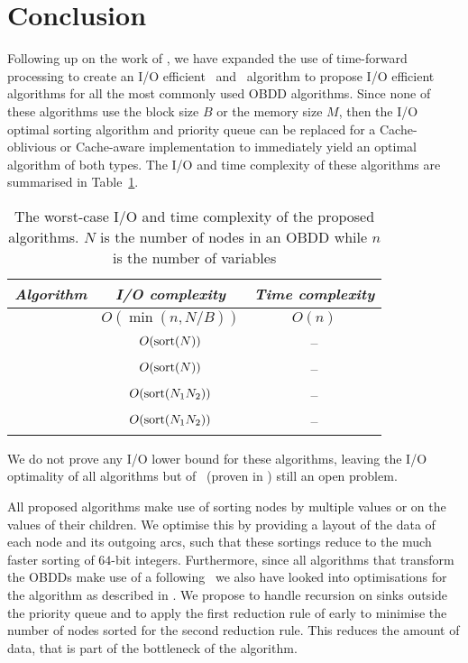 \section{Conclusion} \label{sec:conclusion}
Following up on the work of \cite{Arge96}, we have expanded the use of
time-forward processing to create an I/O efficient \Reduce\ and \Apply\
algorithm to propose I/O efficient algorithms for all the most commonly used
OBDD algorithms. Since none of these algorithms use the block size $B$ or the
memory size $M$, then the I/O optimal sorting algorithm and priority queue can
be replaced for a Cache-oblivious or Cache-aware implementation to immediately
yield an optimal algorithm of both types. The I/O and time complexity of these
algorithms are summarised in Table~\ref{tab:summary_efficiency}.

\begin{table}[ht!]
  \centering
  \begin{tabular}{c | c | c}
    \emph{Algorithm} & \emph{I/O complexity} & \emph{Time complexity}
    \\ \hline
    \Evaluate & $O(\min(n, N/B))$ & $O(n)$
    \\
    \Reduce & $O(\text{sort}(N))$ & --
    \\
    \Restrict & $O(\text{sort}(N))$ & --
    \\
    \Apply & $O(\text{sort}(N_1 N_2))$ & --
    \\
    \Isomorphic & $O(\text{sort}(N_1 N_2))$ & --
    \\
  \end{tabular}
  \caption{The worst-case I/O and time complexity of the proposed algorithms.
    $N$ is the number of nodes in an OBDD while $n$ is the number of variables}
  \label{tab:summary_efficiency}
\end{table}

We do not prove any I/O lower bound for these algorithms, leaving the I/O
optimality of all algorithms but of \Reduce\ (proven in \cite{Arge96}) still an
open problem.

All proposed algorithms make use of sorting nodes by multiple values or on the
values of their children. We optimise this by providing a layout of the data of
each node and its outgoing arcs, such that these sortings reduce to the much
faster sorting of $64$-bit integers. Furthermore, since all algorithms that
transform the OBDDs make use of a following \Reduce\ we also have looked into
optimisations for the algorithm as described in \cite{Arge96}. We propose to
handle recursion on sinks outside the priority queue and to apply the first
reduction rule of \cite{Bryant86} early to minimise the number of nodes sorted
for the second reduction rule. This reduces the amount of data, that is part of
the bottleneck of the algorithm.

